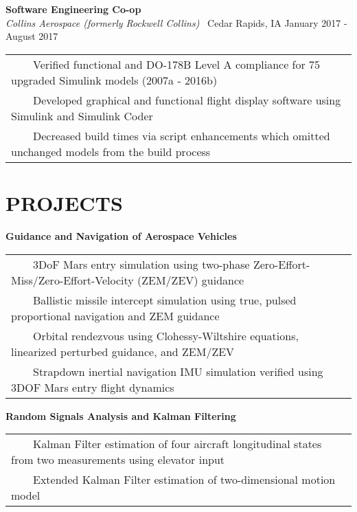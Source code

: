\documentclass[overlapped, 11pt]{res}
\newcommand{\tabitem}{~~\textbullet~~}
\begin{document}
\begin{resume}
\begin{itemize}
            \vspace{0.25em}
            \textbf{Software Engineering Co-op}\\
            \emph{Collins Aerospace (formerly Rockwell Collins)} \textbar 
                \ Cedar Rapids, IA \hfill January 2017 - August 2017
            \begin{tabular}{l}
                \tabitem Verified functional and DO-178B Level A compliance for 75 upgraded Simulink models (2007a - 2016b) \\
                \tabitem Developed graphical and functional flight display software using Simulink and Simulink Coder \\
                \tabitem Decreased build times via script enhancements which omitted unchanged models from the build process \\
            \end{tabular}
            
                
         \section{PROJECTS}
                
            \textbf{Guidance and Navigation of Aerospace Vehicles} \\
                \begin{tabular}{l}
                    \tabitem 3DoF Mars entry simulation using two-phase Zero-Effort-Miss/Zero-Effort-Velocity (ZEM/ZEV) guidance\\
                    \tabitem Ballistic missile intercept simulation using true, pulsed proportional navigation and ZEM guidance\\
                    \tabitem Orbital rendezvous using Clohessy-Wiltshire equations, linearized perturbed guidance, and ZEM/ZEV\\
                    \tabitem Strapdown inertial navigation IMU simulation verified using 3DOF Mars entry flight dynamics\\
                \end{tabular}

            \textbf{Random Signals Analysis and Kalman Filtering}\\
                \begin{tabular}{l}
                    \tabitem Kalman Filter estimation of four aircraft longitudinal states from two measurements using elevator input\\
                    \tabitem Extended Kalman Filter estimation of two-dimensional motion model\\
                \end{tabular}
                

\end{itemize}
\end{resume}
\end{document}
